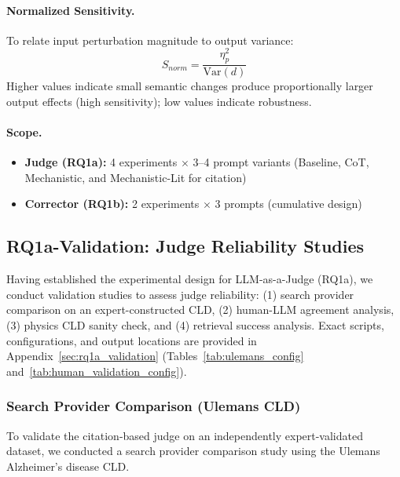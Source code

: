 \paragraph{Normalized Sensitivity.}
To relate input perturbation magnitude to output variance:
\begin{equation}
S_{norm} = \frac{\eta^2_p}{\text{Var}(d)}
\end{equation}
Higher values indicate small semantic changes produce proportionally larger output effects (high sensitivity); low values indicate robustness.

\paragraph{Scope.}
\begin{itemize}[noitemsep]
    \item \textbf{Judge (RQ1a):} 4 experiments $\times$ 3--4 prompt variants (Baseline, CoT, Mechanistic, and Mechanistic-Lit for citation)
    \item \textbf{Corrector (RQ1b):} 2 experiments $\times$ 3 prompts (cumulative design)
\end{itemize}

\subsection{RQ1a-Validation: Judge Reliability Studies}
\label{sec:rq1a_validation_studies}

Having established the experimental design for LLM-as-a-Judge (RQ1a), we conduct validation studies to assess judge reliability: (1) search provider comparison on an expert-constructed CLD, (2) human-LLM agreement analysis, (3) physics CLD sanity check, and (4) retrieval success analysis.
Exact scripts, configurations, and output locations are provided in Appendix~\ref{sec:rq1a_validation} (Tables~\ref{tab:ulemans_config} and~\ref{tab:human_validation_config}).

\subsubsection{Search Provider Comparison (Ulemans CLD)}
\label{sec:ulemans_validation}

To validate the citation-based judge on an independently expert-validated dataset, we conducted a search provider comparison study using the Ulemans Alzheimer's disease CLD.

